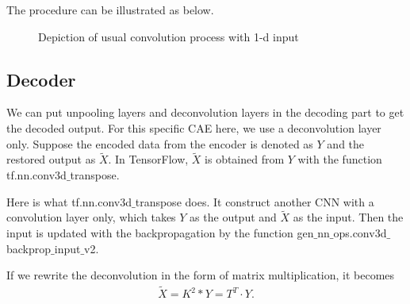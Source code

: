 The procedure can be illustrated as below.
\begin{figure}[htbp]
\caption{Depiction of usual convolution process with 1-d input}
\end{figure}


\subsection{Decoder}
We can put unpooling layers and deconvolution layers in the decoding part to get the decoded output. For this specific CAE here, we use a deconvolution layer only.
Suppose the encoded data from the encoder is denoted as $Y$ and the restored output as $\tilde{X}$. In TensorFlow, $\tilde{X}$ is obtained from $Y$ with the function tf.nn.conv3d$\_$transpose. 

Here is what tf.nn.conv3d$\_$transpose does.
It construct another CNN with a convolution layer only, which takes $Y$ as the output and $\tilde{X}$ as the input. Then  the input is updated with the backpropagation by the function gen$\_$nn$\_$ops.conv3d$\_$backprop$\_$input$\_$v2. %

If we rewrite the deconvolution in the form of matrix multiplication, it becomes
\begin{align}
   \tilde{X} = K^2 * Y = T^T \cdot Y.
\end{align}


